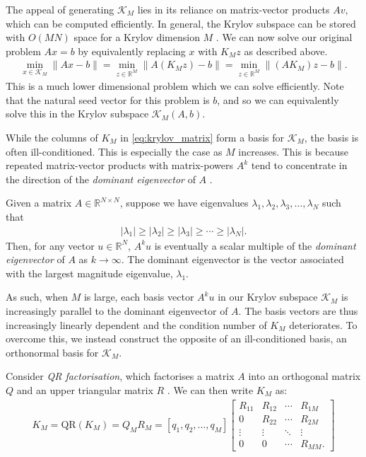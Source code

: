 The appeal of generating $\mathcal{K}_M$ lies in its reliance on matrix-vector products $A v$, which can be computed efficiently. In general, the Krylov subspace can be stored with $O(M N)$ space for a Krylov dimension $M$ \citep{NoceWrig06, pytorch}. We can now solve our original problem $Ax = b$ by equivalently replacing $x$ with $K_M z$ as described above.
\begin{align}
    \min_{x \in \mathcal{K}_M} \| A x - b \| = \min_{z \in \mathbb{R}^M} \| A (K_M z) - b \| = \min_{z \in \mathbb{R}^M} \| (A K_M) z - b \|.
    \label{equation:krylov_subspace_problem}
\end{align}
This is a much lower dimensional problem which we can solve efficiently.
Note that the natural seed vector for this problem is $b$, and so we can equivalently solve this in the Krylov subspace $\mathcal{K}_M(A, b)$.

While the columns of $K_M$ in \cref{eq:krylov_matrix} form a basis for $\mathcal{K}_M$, the basis is often ill-conditioned. This is especially the case as $M$ increases. This is because repeated matrix-vector products with matrix-powers $A^k$ tend to concentrate in the direction of the \textit{dominant eigenvector} of $A$ \citep{krylov_book}.
\begin{definition}
    Given a matrix $A \in \mathbb{R}^{N \times N}$, suppose we have eigenvalues $\lambda_1, \lambda_2, \lambda_3, \ldots, \lambda_N$ such that 
    \begin{align}
        |\lambda_1| \geq |\lambda_2| \geq |\lambda_3| \geq \cdots \geq |\lambda_N|.
    \end{align}
    Then, for any vector $u \in \mathbb{R}^N$, $A^k u$ is eventually a scalar multiple of the \textit{dominant eigenvector} of $A$ as $k \to \infty$. The dominant eigenvector is the vector associated with the largest magnitude eigenvalue, $\lambda_1$.
\end{definition}

As such, when $M$ is large, each basis vector $A^k u$ in our Krylov subspace $\mathcal{K}_M$ is increasingly parallel to the dominant eigenvector of $A$. The basis vectors are thus increasingly linearly dependent and the condition number of $K_M$ deteriorates. To overcome this, we instead construct the opposite of an ill-conditioned basis, an orthonormal basis for $\mathcal{K}_M$. 

Consider \textit{QR factorisation}, which factorises a matrix $A$ into an orthogonal matrix $Q$ and an upper triangular matrix $R$ \citep{NoceWrig06}. We can then write $K_M$ as:
\begin{align}
K_M = \text{QR}(K_M) = Q_M R_M = [q_1, q_2, \ldots, q_M] 
\begin{bmatrix} 
R_{11} & R_{12} & \cdots & R_{1M} \\ 
0 & R_{22} & \cdots & R_{2M} \\ 
\vdots & \vdots & \ddots & \vdots \\ 
0 & 0 & \cdots & R_{MM}.
\end{bmatrix}
\end{align}

